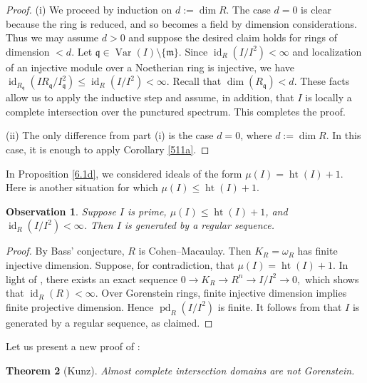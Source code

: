 \documentclass[10. pt,a4paper]{amsart}
\newtheorem{theorem}{Theorem}[section]
\newtheorem{observation}[theorem]{Observation}
\theoremstyle{definition}
\theoremstyle{remark}
\newcommand{\id}{\operatorname{id}}
\newcommand{\pd}{\operatorname{pd}}
\begin{document}
\begin{proof}
(i)	We proceed by induction on $d := \dim R$. The case $d = 0$ is clear because the ring is reduced, and so becomes a field by dimension considerations. Thus we may assume $d > 0$ and suppose the desired claim holds for rings of dimension $< d$. Let $\mathfrak{q} \in \operatorname{Var}(I) \setminus \{\mathfrak{m}\}$. Since $\operatorname{id}_R(I/I^2) < \infty$ and localization of an injective module over a Noetherian ring is injective, we have $\operatorname{id}_{R_{\mathfrak{q}}}(I R_{\mathfrak{q}} / I_{\mathfrak{q}}^2) \leq \operatorname{id}_R(I/I^2) < \infty$. Recall that $\dim(R_{\mathfrak{q}}) < d$. These facts allow us to apply the inductive step and assume, in addition, that $I$ is locally a complete intersection over the punctured spectrum. This completes the proof.


(ii) The only difference from part (i) is the case $d = 0$, where $d := \dim R$. In this case, it is enough to apply Corollary \ref{511a}.
\end{proof}

In Proposition \ref{6.1d}, we considered ideals of the form $\mu(I) = \operatorname{ht}(I) + 1$. Here is another situation for which $\mu(I) \leq \operatorname{ht}(I) + 1$.

\begin{observation}\label{alm}
	Suppose $I$ is prime, $\mu(I) \leq \operatorname{ht}(I) + 1$, and $\id_R(I/I^2) < \infty$. Then $I$ is generated by a regular sequence.
\end{observation}

\begin{proof}
	By Bass' conjecture, $R$ is Cohen--Macaulay. Then $K_R = \omega_R$ has finite injective dimension. Suppose, for contradiction, that $\mu(I) = \operatorname{ht}(I) + 1$. In light of \cite[Proposition 1]{matsuoka}, there exists an exact sequence
	\(
	0 \longrightarrow K_R \longrightarrow R^n \longrightarrow I/I^2 \longrightarrow 0,
	\)
	which shows that $\id_R(R) < \infty$. Over Gorenstein rings, finite injective dimension implies finite projective dimension. Hence $\pd_R(I/I^2)$ is finite. It follows from \cite{v} that $I$ is generated by a regular sequence, as claimed.
\end{proof}

Let us present a new proof of \cite{kunz}:

\begin{theorem}[Kunz]
	Almost complete intersection domains are not Gorenstein.
\end{theorem}
\end{document}
